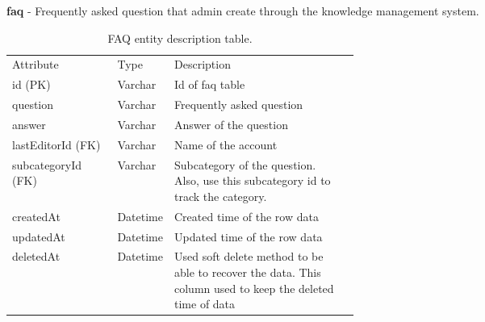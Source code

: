 \documentclass[12pt,oneside,openright,a4paper]{cpe-english-project}
\begin{document}
\textbf{faq} - Frequently asked question that admin create through the knowledge management system.
\begin{table}[ht]
	\caption{FAQ entity description table.}
	\label{tab:FAQ entity description table.}
\begin{adjustbox}{width=\textwidth}
\begin{tabular}{llp{0.5\linewidth}l}
\rowcolor[HTML]{5B9BD5} 
Attribute          & Type     & Description                                                                                                   \\
\rowcolor[HTML]{DEEAF6} 
id (PK)            & Varchar  & Id of faq table                                                                                               \\
question           & Varchar  & Frequently asked   question                                                                                   \\
\rowcolor[HTML]{DEEAF6} 
answer             & Varchar  & Answer of the question                                                                                        \\
lastEditorId (FK)  & Varchar  & Name of the account                                                                                           \\
\rowcolor[HTML]{DEEAF6} 
subcategoryId (FK) & Varchar  & Subcategory of the question. Also, use this subcategory id to track   the category.                           \\
createdAt          & Datetime & Created time of the row   data                                                                                \\
\rowcolor[HTML]{DEEAF6} 
updatedAt          & Datetime & Updated time of the row data                                                                                  \\
deletedAt          & Datetime & Used soft delete method   to be able to recover the data. This column used to keep the deleted time of data
\end{tabular}
\end{adjustbox}
\end{table}
\end{document}
